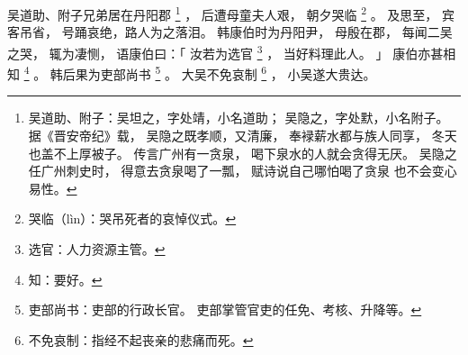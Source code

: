 
\switchcolumn*[\section{}]

吴道助、附子兄弟居在丹阳郡%
\footnote{%
    吴道助、附子：吴坦之，字处靖，小名道助；
                  吴隐之，字处默，小名附子。
                  据《晋安帝纪》载，
                  吴隐之既孝顺，又清廉，
                  奉䘵薪水都与族人同享，
                  冬天也盖不上厚被子。
                  传言广州有一贪泉，
                  喝下泉水的人就会贪得无厌。
                  吴隐之任广州刺史时，
                  得意去贪泉喝了一瓢，
                  赋诗说自己哪怕喝了贪泉
                  也不会变心易性。
}%
，
后遭母童夫人艰，
朝夕哭临%
\footnote{%
    哭临（lìn）：哭吊死者的哀悼仪式。
}%
。
及思至，
宾客吊省，
号踊哀绝，路人为之落泪。
韩康伯时为丹阳尹，
母殷在郡，
每闻二吴之哭，
辄为凄恻，
语康伯曰：「
    汝若为选官%
    \footnote{%
        选官：人力资源主管。
    }%
    ，
    当好料理此人。
」
康伯亦甚相知%
\footnote{%
    知：要好。
}%
。
韩后果为吏部尚书%
\footnote{%
    吏部尚书：吏部的行政长官。
              吏部掌管官吏的任免、考核、升降等。
}%
。
大吴不免哀制%
\footnote{%
    不免哀制：指经不起丧亲的悲痛而死。
}%
，
小吴遂大贵达。

\switchcolumn



